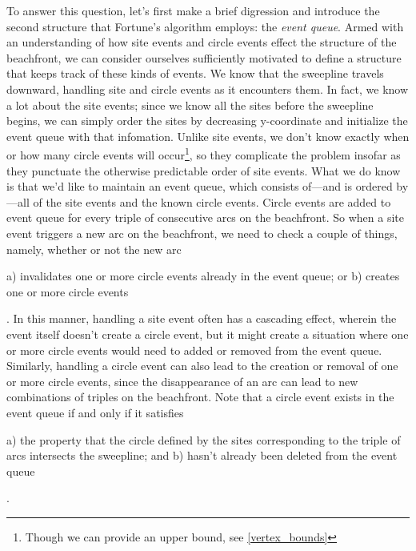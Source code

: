 \documentclass[12pt,twoside]{reedthesis}
\begin{document}
  To answer this question, let's first make a brief digression and introduce the second structure that Fortune's algorithm employs: the \emph{event queue}. Armed with an understanding of how site events and circle events effect the structure of the beachfront, we can consider ourselves sufficiently motivated to define a structure that keeps track of these kinds of events. We know that the sweepline travels downward, handling site and circle events as it encounters them. In fact, we know a lot about the site events; since we know all the sites before the sweepline begins, we can simply order the sites by decreasing y-coordinate and initialize the event queue with that infomation. Unlike site events, we don't know exactly when or how many circle events will occur\footnote{Though we can provide an upper bound, see \cref{vertex_bounds}}, so they complicate the problem insofar as they punctuate the otherwise predictable order of site events. What we do know is that we'd like to maintain an event queue, which consists of---and is ordered by---all of the site events and the known circle events.  Circle events are added to event queue for every triple of consecutive arcs on the beachfront. So when a site event triggers a new arc on the beachfront, we need to check a couple of things, namely, whether or not the new arc\begin{inparaenum}
  a) invalidates one or more circle events already in the event queue; or
  b) creates one or more circle events\end{inparaenum}. In this manner, handling a site event often has a cascading effect, wherein the event itself doesn't create a circle event, but it might create a situation where one or more circle events would need to added or removed from the event queue. Similarly, handling a circle event can also lead to the creation or removal of one or more circle events, since the disappearance of an arc can lead to new combinations of triples on the beachfront. Note that a circle event exists in the event queue if and only if it satisfies\begin{inparaenum}
  a) the property that the circle defined by the sites corresponding to the triple of arcs intersects the sweepline; and
  b) hasn't already been deleted from the event queue\end{inparaenum}.
\end{document}
